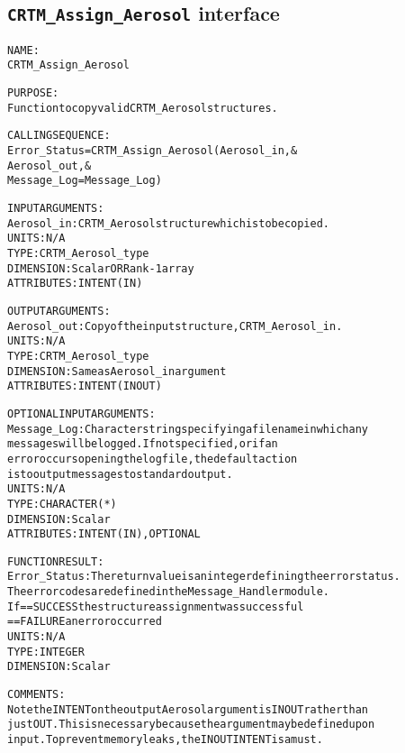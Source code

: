 \subsection{\texttt{CRTM\_Assign\_Aerosol} interface}
  \label{sec:CRTM_Assign_Aerosol_interface}
  \begin{alltt}
 
  NAME:
        CRTM_Assign_Aerosol
 
  PURPOSE:
        Function to copy valid CRTM_Aerosol structures.
 
  CALLING SEQUENCE:
        Error_Status = CRTM_Assign_Aerosol( Aerosol_in             , &
                                            Aerosol_out            , &
                                            Message_Log=Message_Log  )
 
  INPUT ARGUMENTS:
        Aerosol_in:      CRTM_Aerosol structure which is to be copied.
                         UNITS:      N/A
                         TYPE:       CRTM_Aerosol_type
                         DIMENSION:  Scalar OR Rank-1 array
                         ATTRIBUTES: INTENT(IN)
 
  OUTPUT ARGUMENTS:
        Aerosol_out:     Copy of the input structure, CRTM_Aerosol_in.
                         UNITS:      N/A
                         TYPE:       CRTM_Aerosol_type
                         DIMENSION:  Same as Aerosol_in argument
                         ATTRIBUTES: INTENT(IN OUT)
 
 
  OPTIONAL INPUT ARGUMENTS:
        Message_Log:     Character string specifying a filename in which any
                         messages will be logged. If not specified, or if an
                         error occurs opening the log file, the default action
                         is to output messages to standard output.
                         UNITS:      N/A
                         TYPE:       CHARACTER(*)
                         DIMENSION:  Scalar
                         ATTRIBUTES: INTENT(IN), OPTIONAL
 
  FUNCTION RESULT:
        Error_Status:    The return value is an integer defining the error status.
                         The error codes are defined in the Message_Handler module.
                         If == SUCCESS the structure assignment was successful
                            == FAILURE an error occurred
                         UNITS:      N/A
                         TYPE:       INTEGER
                         DIMENSION:  Scalar
 
  COMMENTS:
        Note the INTENT on the output Aerosol argument is IN OUT rather than
        just OUT. This is necessary because the argument may be defined upon
        input. To prevent memory leaks, the IN OUT INTENT is a must.
 
  \end{alltt}
